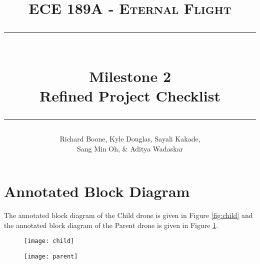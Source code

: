\documentclass[paper=a4, fontsize=10pt]{scrartcl}
\title{
		\vspace{-1in} 	
		\usefont{OT1}{bch}{b}{n}
		\normalfont \large \textsc{ECE 189A - Eternal Flight} \\ [10pt]
		\rule{\linewidth}{2pt} \\ [0.3cm]
		\Huge Milestone 2 \\ [3pt]
		\LARGE Refined Project Checklist \\
		\rule{\linewidth}{2pt}
}
\author{
		\normalfont 
		\large Richard Boone, Kyle Douglas, Sayali Kakade, \\ [-3pt]		 			
		\large Sang Min Oh, \& Aditya Wadaskar
}
\date{}
\begin{document}
\maketitle

\vspace{-0.5in}%
\section{Annotated Block Diagram}
The annotated block diagram of the Child drone is given in Figure \ref{fig:child} and the annotated block diagram of the Parent drone is given in Figure \ref{fig:parent}.

\begin{figure}
	\centering
	\begin{minipage}[b]{0.5\textwidth}
		\centering
		\texttt{[image: child]}
		\label{fig:child}
	\end{minipage}%
	\begin{minipage}[b]{0.5\textwidth}
		\centering
		\texttt{[image: parent]}
		\label{fig:parent}
	\end{minipage}
\end{figure}
\end{document}
